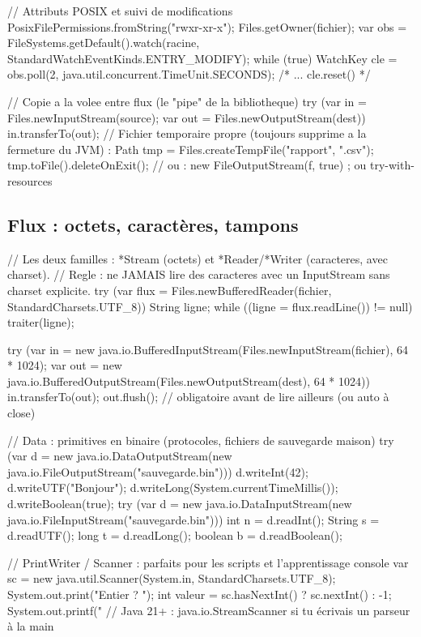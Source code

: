 \documentclass[12pt,a4paper,twoside,openright]{book}
\begin{document}
\begin{codejava}
// Attributs POSIX et suivi de modifications
PosixFilePermissions.fromString("rwxr-xr-x");
Files.getOwner(fichier);
var obs = FileSystems.getDefault().watch(racine, StandardWatchEventKinds.ENTRY_MODIFY);
while (true) { WatchKey cle = obs.poll(2, java.util.concurrent.TimeUnit.SECONDS); /* ... cle.reset() */ }

// Copie a la volee entre flux (le "pipe" de la bibliotheque)
try (var in = Files.newInputStream(source); var out = Files.newOutputStream(dest)) {
    in.transferTo(out);
}
// Fichier temporaire propre (toujours supprime a la fermeture du JVM) :
Path tmp = Files.createTempFile("rapport", ".csv");
tmp.toFile().deleteOnExit();     // ou : new FileOutputStream(f, true) ; ou try-with-resources
\end{codejava}

\subsection{Flux : octets, caract\`eres, tampons}

\begin{codejava}
// Les deux familles : *Stream (octets) et *Reader/*Writer (caracteres, avec charset).
// Regle : ne JAMAIS lire des caracteres avec un InputStream sans charset explicite.
try (var flux = Files.newBufferedReader(fichier, StandardCharsets.UTF_8)) {
    String ligne;
    while ((ligne = flux.readLine()) != null) { traiter(ligne); }
}

try (var in = new java.io.BufferedInputStream(Files.newInputStream(fichier), 64 * 1024);
     var out = new java.io.BufferedOutputStream(Files.newOutputStream(dest), 64 * 1024)) {
    in.transferTo(out);
    out.flush();                                   // obligatoire avant de lire ailleurs (ou auto \`a close)
}

// Data : primitives en binaire (protocoles, fichiers de sauvegarde maison)
try (var d = new java.io.DataOutputStream(new java.io.FileOutputStream("sauvegarde.bin"))) {
    d.writeInt(42); d.writeUTF("Bonjour"); d.writeLong(System.currentTimeMillis()); d.writeBoolean(true);
}
try (var d = new java.io.DataInputStream(new java.io.FileInputStream("sauvegarde.bin"))) {
    int n = d.readInt(); String s = d.readUTF(); long t = d.readLong(); boolean b = d.readBoolean();
}

// PrintWriter / Scanner : parfaits pour les scripts et l'apprentissage console
var sc = new java.util.Scanner(System.in, StandardCharsets.UTF_8);
System.out.print("Entier ? "); int valeur = sc.hasNextInt() ? sc.nextInt() : -1;
System.out.printf("%
// Java 21+ : java.io.StreamScanner si tu \'ecrivais un parseur \`a la main
\end{codejava}
\end{document}
